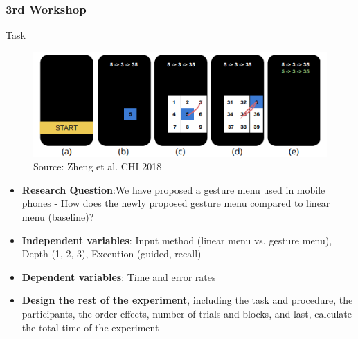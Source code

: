 \documentclass{beamer}
\begin{document}
\begin{frame}
	\frametitle{3rd Workshop}
	\begin{block}{Task}	
	\begin{figure}
		\includegraphics[width=0.5\linewidth]{gestures}
		\caption{Source: Zheng et al. CHI 2018}
	\end{figure}
	\vspace{-15pt}
	\footnotesize
	\begin{itemize}
		\item \textbf{Research Question}:We have proposed a gesture menu used in mobile phones - How does the newly proposed gesture menu compared to linear menu (baseline)?
		\item \textbf{Independent variables}: Input method (linear menu vs. gesture menu), Depth (1, 2, 3), Execution (guided, recall)
		\item \textbf{Dependent variables}: Time and error rates
		\item \textbf{Design the rest of the experiment}, including the task and procedure, the participants, the order effects, number of trials and blocks, and last, calculate the total time of the experiment
	\end{itemize}
	\end{block}
\end{frame}
\end{document}
